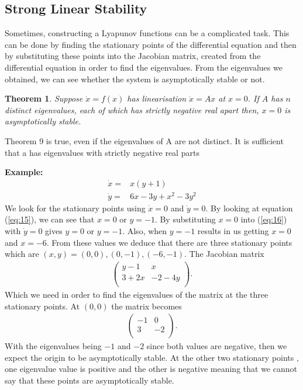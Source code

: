 \documentclass[a4paper]{report}
\newtheorem{thm}{Theorem}
\theoremstyle{definition}
\begin{document}
\subsection{Strong Linear Stability}

Sometimes, constructing a Lyapunov functions can be a complicated task. This can be done by finding the stationary points of the differential equation and then by substituting these points into the Jacobian matrix, created  from the differential equation in order to find the eigenvalues. From the eigenvalues we obtained, we can see whether the system is asymptotically stable or not.
\newline
 \begin{mdframed}[backgroundcolor=airforceblue!25] 
\begin{thm} \label{thm:4}
Suppose $\dot{x}=f(x)$ has linearisation $\dot{x}=Ax$ at $x=0$. If $A$ has $n$ distinct eigenvalues, each of which has strictly negative real apart then, $x=0$ is asymptotically stable.
\end{thm}
\end{mdframed}
Theorem 9 is true, even if the eigenvalues of A are not distinct. It is sufficient that a has eigenvalues with strictly negative real parts

\textbf{Example:}
\begin{align}
\dot{x}=&x(y+1)\label{eq:15}\\
\dot{y}=&6x-3y+x^2-3y^2\label{eq:16}
\end{align}
We look for the stationary points using $\dot{x}=0$ and $\dot{y}=0$. By looking at equation (\ref{eq:15}), we can see that $x=0$ or $y=-1$. By substituting $x=0$ into (\ref{eq:16}) with $\dot{y}=0$ gives $y=0$ or $y=-1$. Also, when $y=-1$ results in us getting $x=0$ and $x=-6$. From these values we deduce that there are three stationary points which are $(x,y)=(0,0), (0,-1),(-6,-1).$ The Jacobian matrix \\
\begin{align}\label{eq:17}
\left( \begin{array}{cc} y-1 & x  \\ 3+2x & -2-4y  \\  \end{array} \right).
\end{align}
Which we need in order to find the eigenvalues of the matrix at the three stationary points. At $(0,0)$ the matrix becomes 
\begin{align}\label{eq:18}
\left( \begin{array}{cc} -1 & 0  \\ 3 & -2  \\  \end{array} \right).
\end{align}
With the eigenvalues being $-1$ and $-2$ since both values are negative, then we expect the origin to be asymptotically stable. At the other two stationary points , one eigenvalue value is positive and the other is negative meaning that we cannot say that these points are asymptotically stable.
\end{document}
